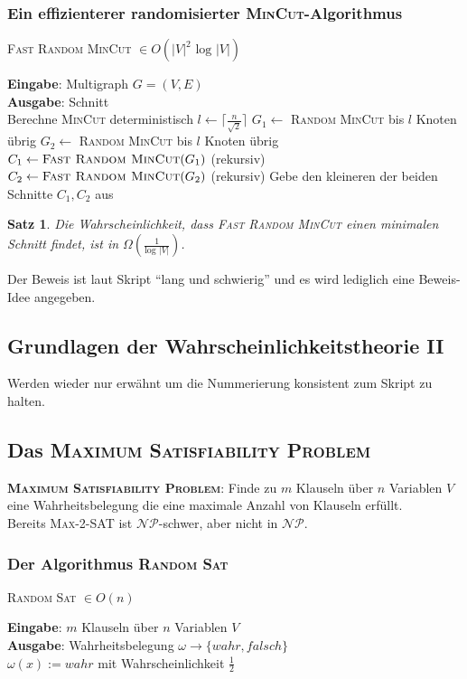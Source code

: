 \documentclass[a4paper,10pt]{scrartcl}
\newcommand{\tbf}{\textbf}
\newcommand{\tsc}{\textsc}
\newcommand{\agn}{\leftarrow}
\newcommand{\Gr}{$G = (V,E)$ }
\newcommand{\NP}{\mathcal{NP}}
\newcommand{\Eingabe}[1]{\STATE \tbf{Eingabe}: #1 \\}
\newcommand{\Ausgabe}[1]{\STATE \tbf{Ausgabe}: #1 \\}
\newtheorem{satz}{Satz}
\begin{document}
\subsubsection{Ein effizienterer randomisierter \tsc{MinCut}-Algorithmus}
\begin{algorithm}
\caption{\tsc{Fast Random MinCut} $\in O(|V|^2 \text{ log } |V|)$}
\begin{algorithmic}
\Eingabe{Multigraph \Gr}
\Ausgabe{Schnitt}
	\STATE Berechne \tsc{MinCut} deterministisch
\ELSE
	\STATE $l \agn \lceil \frac{n}{\sqrt{2}} \rceil$
	\STATE $G_1 \agn$ \tsc{Random MinCut} bis $l$ Knoten übrig
	\STATE $G_2 \agn$ \tsc{Random MinCut} bis $l$ Knoten übrig
	\STATE $C_1 \agn \tsc{Fast Random MinCut}(G_1)$ (rekursiv)
	\STATE $C_2 \agn \tsc{Fast Random MinCut}(G_2)$ (rekursiv)
	\STATE Gebe den kleineren der beiden Schnitte $C_1, C_2$ aus
\ENDIF
\end{algorithmic}
\end{algorithm}

\begin{satz}
 Die Wahrscheinlichkeit, dass \tsc{Fast Random MinCut} einen minimalen Schnitt findet, ist in $\Omega(\frac{1}{\text{log } |V|})$.
\end{satz}

Der Beweis ist laut Skript ``lang und schwierig'' und es wird lediglich eine Beweis-Idee angegeben. \\

\subsection{Grundlagen der Wahrscheinlichkeitstheorie II}
Werden wieder nur erwähnt um die Nummerierung konsistent zum Skript zu halten. \\

\subsection{Das \tsc{Maximum Satisfiability Problem}}
\tbf{\tsc{Maximum Satisfiability Problem}}: Finde zu $m$ Klauseln über $n$ Variablen $V$ eine Wahrheitsbelegung die eine maximale Anzahl von Klauseln erfüllt. \\

Bereits \tsc{Max-2-SAT} ist $\NP$-schwer, aber nicht in $\NP$. \\

\subsubsection{Der Algorithmus \tsc{Random Sat}}
\begin{algorithm}
\caption{\tsc{Random Sat} $\in O(n)$}
\begin{algorithmic}
\Eingabe{$m$ Klauseln über $n$ Variablen $V$}
\Ausgabe{Wahrheitsbelegung $\omega \rightarrow \{wahr, falsch\}$}
	\STATE $\omega(x) := wahr$ mit Wahrscheinlichkeit $\frac{1}{2}$
\ENDFOR
\end{algorithmic}
\end{algorithm}
\end{document}
